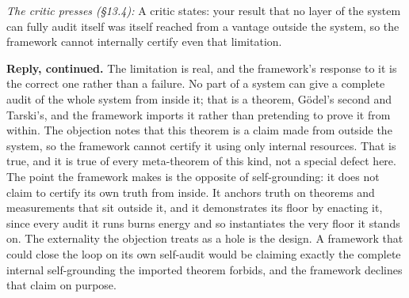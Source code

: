 \documentclass[10pt,twocolumn]{article}
\begin{document}
\emph{The critic presses (§13.4):} A critic states: your result that no
layer of the system can fully audit itself was itself reached from a
vantage outside the system, so the framework cannot internally certify
even that limitation.

\textbf{Reply, continued.} The limitation is real, and the framework's
response to it is the correct one rather than a failure. No part of a
system can give a complete audit of the whole system from inside it;
that is a theorem, Gödel's second and Tarski's, and the framework
imports it rather than pretending to prove it from within. The objection
notes that this theorem is a claim made from outside the system, so the
framework cannot certify it using only internal resources. That is true,
and it is true of every meta-theorem of this kind, not a special defect
here. The point the framework makes is the opposite of self-grounding:
it does not claim to certify its own truth from inside. It anchors truth
on theorems and measurements that sit outside it, and it demonstrates
its floor by enacting it, since every audit it runs burns energy and so
instantiates the very floor it stands on. The externality the objection
treats as a hole is the design. A framework that could close the loop on
its own self-audit would be claiming exactly the complete internal
self-grounding the imported theorem forbids, and the framework declines
that claim on purpose.
\end{document}
